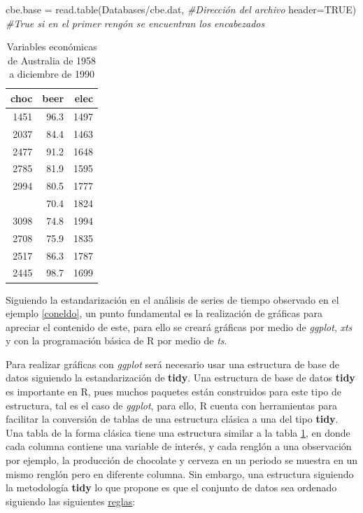 \documentclass[
  spanish,
]{book}
\newenvironment{Shaded}{\begin{snugshade}}{\end{snugshade}}
\newcommand{\AttributeTok}[1]{\textcolor[rgb]{0.77,0.63,0.00}{#1}}
\newcommand{\CommentTok}[1]{\textcolor[rgb]{0.56,0.35,0.01}{\textit{#1}}}
\newcommand{\ConstantTok}[1]{\textcolor[rgb]{0.00,0.00,0.00}{#1}}
\newcommand{\FunctionTok}[1]{\textcolor[rgb]{0.00,0.00,0.00}{#1}}
\newcommand{\NormalTok}[1]{#1}
\newcommand{\OtherTok}[1]{\textcolor[rgb]{0.56,0.35,0.01}{#1}}
\newcommand{\StringTok}[1]{\textcolor[rgb]{0.31,0.60,0.02}{#1}}
\theoremstyle{remark}
\begin{document}
\begin{Shaded}
\begin{Highlighting}[]
\NormalTok{cbe.base }\OtherTok{=} \FunctionTok{read.table}\NormalTok{(}\StringTok{\textquotesingle{}Databases/cbe.dat\textquotesingle{}}\NormalTok{, }\CommentTok{\#Dirección del archivo}
          \AttributeTok{header=}\ConstantTok{TRUE}\NormalTok{) }\CommentTok{\#True si en el primer rengón se encuentran los encabezados}
\end{Highlighting}
\end{Shaded}

\begin{table}

\caption{\label{tab:australia}Variables económicas de Australia de 1958 a diciembre de 1990 }
\centering
\begin{tabular}[t]{rrr}
\toprule
choc & beer & elec\\
\midrule
1451 & 96.3 & 1497\\
2037 & 84.4 & 1463\\
2477 & 91.2 & 1648\\
2785 & 81.9 & 1595\\
2994 & 80.5 & 1777\\
\addlinespace
2681 & 70.4 & 1824\\
3098 & 74.8 & 1994\\
2708 & 75.9 & 1835\\
2517 & 86.3 & 1787\\
2445 & 98.7 & 1699\\
\bottomrule
\end{tabular}
\end{table}

Siguiendo la estandarización en el análisis de series de tiempo observado en el ejemplo \ref{coneldo}, un punto fundamental es la realización de gráficas para apreciar el contenido de este, para ello se creará gráficas por medio de \emph{ggplot}, \emph{xts} y con la programación básica de R por medio de \emph{ts}.

Para realizar gráficas con \emph{ggplot} será necesario usar una estructura de base de datos siguiendo la estandarización de \textbf{tidy}. Una estructura de base de datos \textbf{tidy} es importante en R, pues muchos paquetes están construidos para este tipo de estructura, tal es el caso de \emph{ggplot}, para ello, R cuenta con herramientas para facilitar la conversión de tablas de una estructura clásica a una del tipo \textbf{tidy}. Una tabla de la forma clásica tiene una estructura similar a la tabla \ref{tab:australia}, en donde cada columna contiene una variable de interés, y cada renglón a una observación por ejemplo, la producción de chocolate y cerveza en un periodo se muestra en un mismo renglón pero en diferente columna. Sin embargo, una estructura siguiendo la metodología \textbf{tidy} lo que propone es que el conjunto de datos sea ordenado siguiendo las siguientes \href{https://cran.r-project.org/web/packages/tidyr/vignettes/tidy-data.html}{reglas}:
\end{document}
